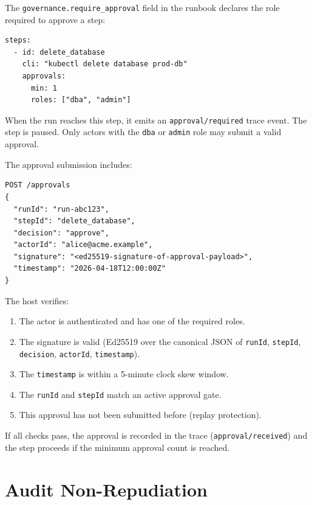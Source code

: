 The \texttt{governance.require\_approval} field in the runbook declares the
role required to approve a step:

\begin{verbatim}
steps:
  - id: delete_database
    cli: "kubectl delete database prod-db"
    approvals:
      min: 1
      roles: ["dba", "admin"]
\end{verbatim}

When the run reaches this step, it emits an
\texttt{approval/required} trace event.  The step is paused.  Only actors with
the \texttt{dba} or \texttt{admin} role may submit a valid approval.

The approval submission includes:

\begin{verbatim}
POST /approvals
{
  "runId": "run-abc123",
  "stepId": "delete_database",
  "decision": "approve",
  "actorId": "alice@acme.example",
  "signature": "<ed25519-signature-of-approval-payload>",
  "timestamp": "2026-04-18T12:00:00Z"
}
\end{verbatim}

The host verifies:

\begin{enumerate}
  \item The actor is authenticated and has one of the required roles.
  \item The signature is valid (Ed25519 over the canonical JSON of
        \texttt{runId}, \texttt{stepId}, \texttt{decision}, \texttt{actorId},
        \texttt{timestamp}).
  \item The \texttt{timestamp} is within a 5-minute clock skew window.
  \item The \texttt{runId} and \texttt{stepId} match an active approval gate.
  \item This approval has not been submitted before (replay protection).
\end{enumerate}

If all checks pass, the approval is recorded in the trace
(\texttt{approval/received}) and the step proceeds if the minimum approval
count is reached.

\section{Audit Non-Repudiation}
\label{sec:audit-nonrepudiation}

